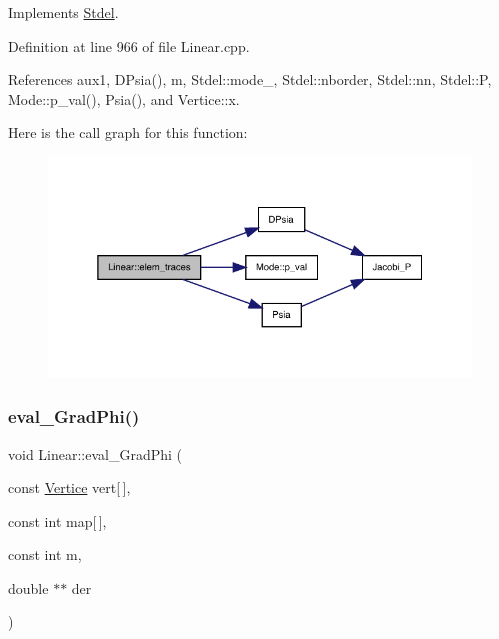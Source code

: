 Implements \hyperlink{classStdel_a3d72869352a2ff5eeb23972eca3b391e}{Stdel}.



Definition at line 966 of file Linear.\+cpp.



References aux1, D\+Psia(), m, Stdel\+::mode\+\_\+, Stdel\+::nborder, Stdel\+::nn, Stdel\+::P, Mode\+::p\+\_\+val(), Psia(), and Vertice\+::x.

Here is the call graph for this function\+:
\nopagebreak
\begin{figure}[H]
\begin{center}
\leavevmode
\includegraphics[width=338pt]{classLinear_a3d3eea37a4e7b5a4af20a70f8100e779_cgraph}
\end{center}
\end{figure}
\mbox{\label{classLinear_aaaecdabce48e08e1ae342646a7340c32}} 
\subsubsection{\texorpdfstring{eval\+\_\+\+Grad\+Phi()}{eval\_GradPhi()}}
{\footnotesize\ttfamily void Linear\+::eval\+\_\+\+Grad\+Phi (\begin{DoxyParamCaption}\item[{const \hyperlink{structVertice}{Vertice}}]{vert\mbox{[}$\,$\mbox{]},  }\item[{const int}]{map\mbox{[}$\,$\mbox{]},  }\item[{const int}]{m,  }\item[{double $\ast$$\ast$}]{der }\end{DoxyParamCaption})\hspace{0.3cm}{\ttfamily [virtual]}}



